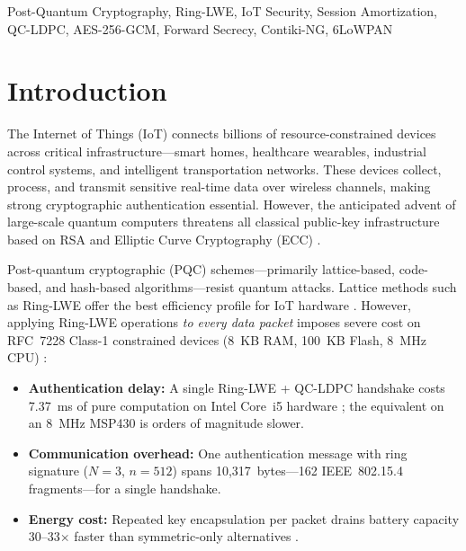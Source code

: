 \documentclass[conference]{IEEEtran}
\begin{document}
\begin{IEEEkeywords}
Post-Quantum Cryptography, Ring-LWE, IoT Security, Session
Amortization, QC-LDPC, AES-256-GCM, Forward Secrecy, Contiki-NG,
6LoWPAN
\end{IEEEkeywords}

\section{Introduction}
\label{sec:intro}

The Internet of Things (IoT) connects billions of resource-constrained
devices across critical infrastructure---smart homes, healthcare
wearables, industrial control systems, and intelligent transportation
networks. These devices collect, process, and transmit sensitive
real-time data over wireless channels, making strong cryptographic
authentication essential. However, the anticipated advent of
large-scale quantum computers threatens all classical public-key
infrastructure based on RSA and Elliptic Curve Cryptography (ECC)
\cite{nist_pqc}.

Post-quantum cryptographic (PQC) schemes---primarily lattice-based,
code-based, and hash-based algorithms---resist quantum attacks.
Lattice methods such as Ring-LWE offer the best efficiency profile for
IoT hardware \cite{lyubashevsky2013}. However, applying Ring-LWE
operations \emph{to every data packet} imposes severe cost on RFC~7228
Class-1 constrained devices (8~KB RAM, 100~KB Flash, 8~MHz CPU)
\cite{rfc7228}:

\begin{itemize}
    \item \textbf{Authentication delay:} A single Ring-LWE + QC-LDPC
    handshake costs 7.37~ms of pure computation on Intel Core~i5
    hardware \cite{kumari2022}; the equivalent on an 8~MHz MSP430 is
    orders of magnitude slower.
    \item \textbf{Communication overhead:} One authentication message
    with ring signature ($N{=}3$, $n{=}512$) spans 10,317~bytes---162
    IEEE~802.15.4 fragments---for a single handshake.
    \item \textbf{Energy cost:} Repeated key encapsulation per packet
    drains battery capacity 30--33$\times$ faster than symmetric-only
    alternatives \cite{kumari2022}.
\end{itemize}
\end{document}

